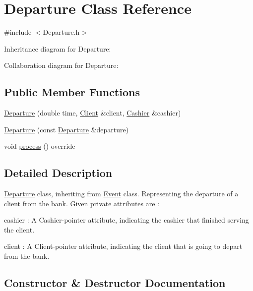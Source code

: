 \hypertarget{classDeparture}{}\section{Departure Class Reference}
\label{classDeparture}


{\ttfamily \#include $<$Departure.\+h$>$}



Inheritance diagram for Departure\+:


Collaboration diagram for Departure\+:
\subsection*{Public Member Functions}
\begin{DoxyCompactItemize}
\item 
\hyperlink{classDeparture_a6e0e7096d54c62c36110229266a8d37e}{Departure} (double time, \hyperlink{classClient}{Client} \&client, \hyperlink{classCashier}{Cashier} \&cashier)
\item 
\hyperlink{classDeparture_ade976c4ac1c737eded923e7e2adbf3f0}{Departure} (const \hyperlink{classDeparture}{Departure} \&departure)
\item 
void \hyperlink{classDeparture_a241611bdf4255d2ba868d58128dddc68}{process} () override
\end{DoxyCompactItemize}


\subsection{Detailed Description}
\hyperlink{classDeparture}{Departure} class, inheriting from \hyperlink{classEvent}{Event} class. Representing the departure of a client from the bank. Given private attributes are \+:
\begin{DoxyItemize}
\item cashier \+: A Cashier-\/pointer attribute, indicating the cashier that finished serving the client.
\item client \+: A Client-\/pointer attribute, indicating the client that is going to depart from the bank. 
\end{DoxyItemize}

\subsection{Constructor \& Destructor Documentation}
\mbox{\label{classDeparture_a6e0e7096d54c62c36110229266a8d37e}} 
